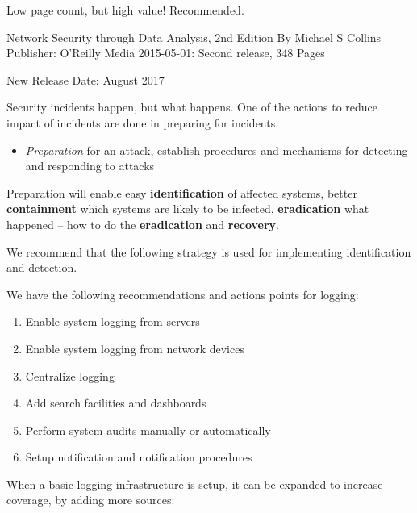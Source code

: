 \documentclass[Screen16to9,17pt]{foils}
\begin{document}


Low page count, but high value! Recommended.

Network Security through Data Analysis, 2nd Edition
By Michael S Collins
Publisher: O'Reilly Media
2015-05-01: Second release, 348 Pages

New Release Date: August 2017





Security incidents happen, but what happens. One of the actions to reduce impact of incidents are done in preparing for incidents.

\begin{itemize}
\item \emph{Preparation} for an attack, establish procedures and mechanisms for detecting and responding to attacks
\end{itemize}

Preparation will enable easy {\bf identification} of affected systems, better {\bf containment} which systems are likely to be infected, {\bf eradication} what happened -- how to do the {\bf eradication} and {\bf recovery}.


We recommend that the following strategy is used for implementing identification and detection.

We have the following recommendations and actions points for logging:
\begin{enumerate}
\item[\faSquareO] Enable system logging from servers
\item[\faSquareO] Enable system logging from network devices
\item[\faSquareO] Centralize logging
\item[\faSquareO] Add search facilities and dashboards
\item[\faSquareO] Perform system audits manually or automatically
\item[\faSquareO] Setup notification and notification procedures
\end{enumerate}

When a basic logging infrastructure is setup, it can be expanded to increase coverage, by
adding more sources:
\end{document}
